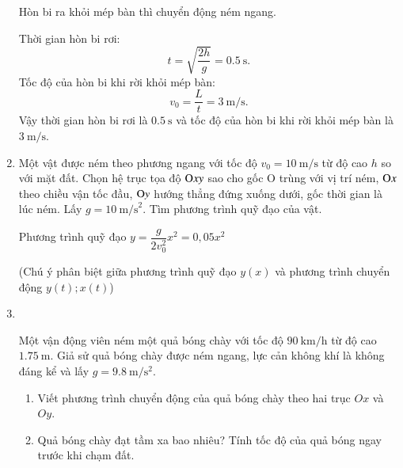 \begin{enumerate}[label=\bfseries Bài \arabic*:,leftmargin=1.5cm]
	\hideall
	{	Hòn bi ra khỏi mép bàn thì chuyển động ném ngang.
		
		Thời gian hòn bi rơi:
		$$t=\sqrt{\dfrac{2h}{g}}=\SI{0.5}{\second}.$$
		Tốc độ của hòn bi khi rời khỏi mép bàn:
		$$v_0=\dfrac{L}{t}=\SI{3}{\meter/\second}.$$
		Vậy thời gian hòn bi rơi là $\SI{0.5}{\second}$ và tốc độ của hòn bi khi rời khỏi mép bàn là $\SI{3}{\meter/\second}$.
	}
	\item {}
	
	
	{Một vật được ném theo phương ngang với tốc độ $v_0 = 10\ \text{m/s}$ từ độ cao $h$ so với mặt đất. Chọn hệ trục tọa độ $\text Oxy$ sao cho gốc O trùng với vị trí ném, $\text O x$ theo chiều vận tốc đầu, $\text Oy$ hướng thẳng đứng xuống dưới, gốc thời gian là lúc ném. Lấy $g=10\ \text{m/s}^2$. Tìm phương trình quỹ đạo của vật.
	}
	
	\hideall
	{	Phương trình quỹ đạo $y=\dfrac{g}{2v_0^2}x^2 = 0,05x^2$
		
		(Chú ý phân biệt giữa phương trình quỹ đạo $y(x)$ và phương trình chuyển động $y(t); x(t)$)
	}
	
	\item {}\\
	{Một vận động viên ném một quả bóng chày với tốc độ $\SI{90}{\kilo\meter/\hour}$ từ độ cao $\SI{1.75}{\meter}$. Giả sử quả bóng chày được ném ngang, lực cản không khí là không đáng kể và lấy $g=\SI{9.8}{\meter/\second^2}$.
		\begin{enumerate}[label=\alph*)]
			\item Viết phương trình chuyển động của quả bóng chày theo hai 	trục $Ox$ và $Oy$.
			\item Quả bóng chày đạt tầm xa bao nhiêu? Tính tốc độ của quả bóng ngay trước khi chạm đất.
		\end{enumerate}
	
}
	

\end{enumerate}
